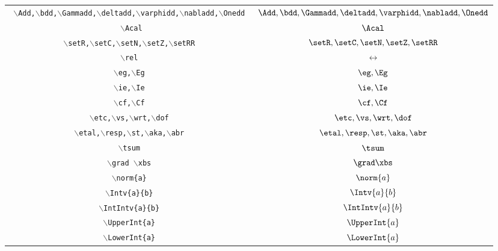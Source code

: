 \documentclass[a4paper,twoside,12pt]{article}
\begin{document}
\begin{table}[h]
\begin{tabular}{|c|c|}
\texttt{   $\backslash$Add,$\backslash$bdd,$\backslash$Gammadd,$\backslash$deltadd,$\backslash$varphidd,$\backslash$nabladd,$\backslash$Onedd } & $     \Add,\bdd,\Gammadd,\deltadd,\varphidd,\nabladd,\Onedd $\\
\texttt{   $\backslash$Acal}& $     \Acal $\\
\texttt{   $\backslash$setR,$\backslash$setC,$\backslash$setN,$\backslash$setZ,$\backslash$setRR }& $     \setR,\setC,\setN,\setZ,\setRR    $\\
\texttt{   $\backslash$rel }& $     \rel  $\\
\texttt{    $\backslash$eg,$\backslash$Eg   } & $     \eg,\Eg   $\\
\texttt{    $\backslash$ie,$\backslash$Ie   } & $     \ie,\Ie   $\\
\texttt{    $\backslash$cf,$\backslash$Cf   } & $     \cf,\Cf   $\\
\texttt{   $\backslash$etc,$\backslash$vs,$\backslash$wrt,$\backslash$dof    } & $     \etc,\vs,\wrt,\dof    $\\
\texttt{    $\backslash$etal,$\backslash$resp,$\backslash$st,$\backslash$aka,$\backslash$abr } & $     \etal,\resp,\st,\aka,\abr $\\
\texttt{    $\backslash$tsum } & $     \tsum $\\
\texttt{    $\backslash$grad $\backslash$xbs    } & $     \grad \xbs    $\\
\texttt{    $\backslash$norm\{a\}  } & $     \norm{a}  $\\
\texttt{$\backslash$Intv\{a\}\{b\}}&$\Intv{a}{b}$\\
\texttt{$\backslash$IntIntv\{a\}\{b\}}&$\IntIntv{a}{b}$\\
\texttt{$\backslash$UpperInt\{a\}}&$\UpperInt{a}$\\
\texttt{$\backslash$LowerInt\{a\}}&$\LowerInt{a}$\\
\hline
\end{tabular}
\end{table}
\end{document}
